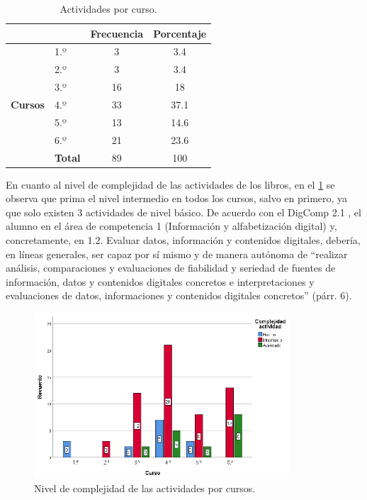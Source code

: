 \documentclass[spanish]{textolivre}
\begin{document}
\begin{table}
\caption{Actividades por curso.}
\label{tbl02}
\small
\centering
\begin{tabular}{clcc}
\toprule
 & & \textbf{Frecuencia} & \textbf{Porcentaje} \\
\midrule
\multirow{7}{*}{\textbf{Cursos}} & {1.º} & 3 & 3.4 \\
 & 2.º            & 3           & 3.4  \\ 
 & 3.º            & 16          & 18   \\ 
 & 4.º            & 33          & 37.1 \\
 & 5.º            & 13          & 14.6 \\ 
 & 6.º            & 21          & 23.6 \\
 & \textbf{Total} & 89          & 100  \\
\bottomrule
\end{tabular}
\end{table}


En cuanto al nivel de complejidad de las actividades de los libros, en el \cref{Fig02} se observa que prima el nivel intermedio en todos los cursos, salvo en primero, ya que solo existen 3 actividades de nivel básico. De acuerdo con el DigComp 2.1 \cite{carretero_2018}, el alumno en el área de competencia 1 (Información y alfabetización digital) y, concretamente, en 1.2. Evaluar datos, información y contenidos digitales, debería, en líneas generales, ser capaz por sí mismo y de manera autónoma de “realizar análisis, comparaciones y evaluaciones de fiabilidad y seriedad de fuentes de información, datos y contenidos digitales concretos e interpretaciones y evaluaciones de datos, informaciones y contenidos digitales concretos” (párr. 6). 

\begin{figure}[htbp]
 \centering
 \includegraphics[width=0.85\textwidth]{Fig02.eps}
 \caption{Nivel de complejidad de las actividades por cursos.}
 \label{Fig02}
\end{figure}
\end{document}
